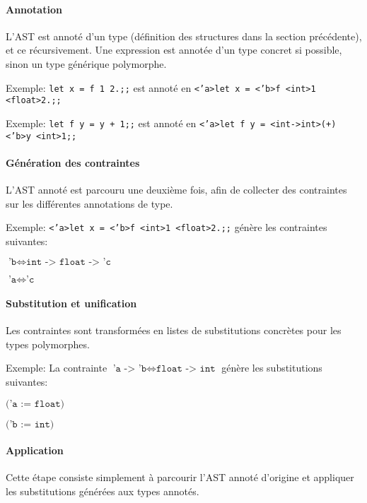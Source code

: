 \documentclass[paper=a4, fontsize=11pt]{scrartcl}
\numberwithin{equation}{section}		%
\numberwithin{figure}{section}			%
\numberwithin{table}{section}				%
\begin{document}
\paragraph{Annotation}
L'AST est annoté d'un type (définition des structures dans la section précédente), et ce récursivement.
Une expression est annotée d'un type concret si possible, sinon un type générique polymorphe.

\begin{small}
    Exemple: \texttt{let x = f 1 2.;;} est annoté en \texttt{<'a>let x = <'b>f <int>1 <float>2.;;}
    
    Exemple: \texttt{let f y = y + 1;;} est annoté en \texttt{<'a>let f y = <int->int>(+) <'b>y <int>1;;}
\end{small}

\paragraph{Génération des contraintes}
L'AST annoté est parcouru une deuxième fois, afin de collecter des contraintes sur les différentes annotations de type.

\begin{small}
    Exemple: \texttt{<'a>let x = <'b>f <int>1 <float>2.;;} génère les contraintes suivantes:
   
    $\texttt{'b} \Longleftrightarrow \texttt{int -> float -> 'c}$
    
    $\texttt{'a} \Longleftrightarrow \texttt{'c}$
\end{small}

\paragraph{Substitution et unification}
Les contraintes sont transformées en listes de substitutions concrètes pour les types polymorphes.

\begin{small}
    Exemple: La contrainte $\texttt{'a -> 'b} \Longleftrightarrow \texttt{float -> int}$ génère les substitutions suivantes:

    $\texttt{('a := float)}$ 
    
    $\texttt{('b := int)}$
\end{small}

\paragraph{Application}
Cette étape consiste simplement à parcourir l'AST annoté d'origine et appliquer les substitutions générées aux types annotés.
\end{document}
